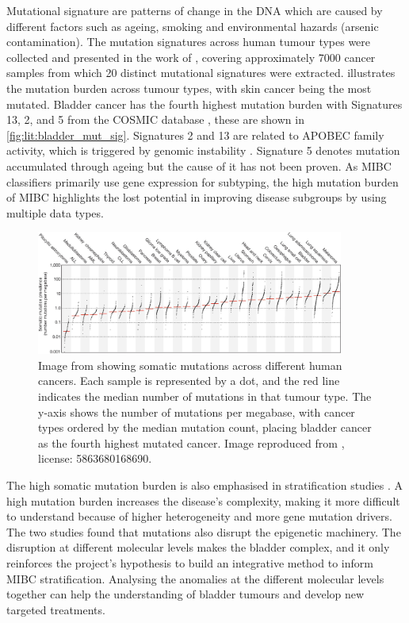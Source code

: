 Mutational signature are patterns of change in the DNA which are caused by different factors such as ageing, smoking and environmental hazards (arsenic contamination). The mutation signatures across human tumour types were collected and presented in the work of \citeauthor{Alexandrov2013-gi}, covering approximately 7000 cancer samples from which 20 distinct mutational signatures were extracted.  illustrates the mutation burden across tumour types, with skin cancer being the most mutated. Bladder cancer has the fourth highest mutation burden with Signatures 13, 2, and 5 from the COSMIC database \citep{Tate2019-yj}, these are shown in \cref{fig:lit:bladder_mut_sig}. Signatures 2 and 13 are related to APOBEC family activity, which is triggered by genomic instability \citep{Baker2022-xw}. Signature 5 denotes mutation accumulated through ageing but the cause of it has not been proven. As MIBC classifiers primarily use gene expression for subtyping, the high mutation burden of MIBC highlights the lost potential in improving disease subgroups by using multiple data types.

\begin{figure}[!t]    
    \centering
\includegraphics[width=0.9\textwidth,height=0.9\textheight,keepaspectratio]{Sections/Lit_review/Resources/mut_sig_cancers.jpg}
    \caption[Somatic mutations across human cancers]{Image from \cite{Alexandrov2013-gi} showing somatic mutations across different human cancers. Each sample is represented by a dot, and the red line indicates the median number of mutations in that tumour type. The y-axis shows the number of mutations per megabase, with cancer types ordered by the median mutation count, placing bladder cancer as the fourth highest mutated cancer. Image reproduced from \citep{Alexandrov2013-gi}, license: 5863680168690. }
    \label{fig:lit:cancer_mut_sig}
\end{figure}

The high somatic mutation burden is also emphasised in stratification studies \citep{Tcga2014-dr, Robertson2017-mg, Kamoun2020-tj}. A high mutation burden increases the disease's complexity, making it more difficult to understand because of higher heterogeneity and more gene mutation drivers. The two studies \citep{Tcga2014-dr, Robertson2017-mg} found that mutations also disrupt the epigenetic machinery. The disruption at different molecular levels makes the bladder complex, and it only reinforces the project's hypothesis to build an integrative method to inform MIBC stratification. Analysing the anomalies at the different molecular levels together can help the understanding of bladder tumours and develop new targeted treatments.


